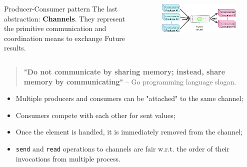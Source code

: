 \documentclass[aspectratio=1610,xcolor=dvipsnames]{beamer}
\begin{document}
%
\begin{frame}
  \begin{columns}[c,onlytextwidth] %
      \begin{block}{Producer-Consumer pattern}
        The last abstraction: \textbf{Channels}. They represent the primitive communication and coordination means to exchange Future results.
      \end{block}
      \begin{figure}
        \centering
        \includegraphics[width=\textwidth]{./images/channels.pdf}
      \end{figure}
  \end{columns}
  \vspace*{1em}
  \begin{quote}
    \centering
    \textbf{"Do not communicate by sharing memory; instead, share memory by communicating"} -- Go programming language slogan.
  \end{quote}
  \small
  \begin{itemize}
      \item Multiple producers and consumers can be "attached" to the same channel;
      \item Consumers compete with each other for sent values;
      \item Once the element is handled, it is immediately removed from the channel;
      \item \texttt{send} and \texttt{read} operations to channels are fair w.r.t. the order of their invocations from multiple process.
  \end{itemize}
\end{frame}

\end{document}
